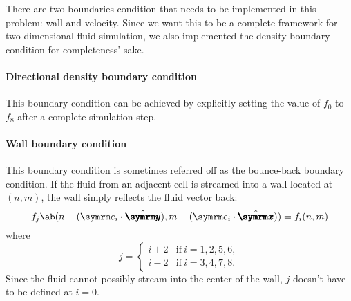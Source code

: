 There are two boundaries condition that needs to be implemented in this problem: wall and velocity. Since we want this to be a complete framework for two-dimensional fluid simulation, we also implemented the density boundary condition for completeness' sake.

\paragraph{Directional density boundary condition} This boundary condition can be achieved by explicitly setting the value of $f_0$ to $f_8$ after a complete simulation step.

\paragraph{Wall boundary condition} This boundary condition is sometimes referred off as the bounce-back boundary condition. If the fluid from an adjacent cell is streamed into a wall located at $(n, m)$, the wall simply reflects the fluid vector back:
\begin{equation}
	f_j\ab(n - (\e_i \vdot \yhat), m - (\e_i \vdot \xhat)) = f_i(n, m)
\end{equation}
where
\begin{equation}
	j = \begin{cases}
		i + 2 & \textrm{if} ~ i = 1, 2, 5, 6, \\
		i - 2 & \textrm{if} ~ i = 3, 4, 7, 8.
	\end{cases}
\end{equation}
Since the fluid cannot possibly stream into the center of the wall, $j$ doesn't have to be defined at $i = 0$. \cite{adams-no-date}

